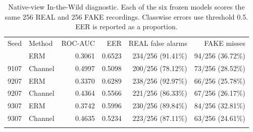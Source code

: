 \begin{table}[t]
\centering
\small
\caption{Native-view In-the-Wild diagnostic. Each of the six frozen models scores the same 256 REAL and 256 FAKE recordings. Classwise errors use threshold 0.5. EER is reported as a proportion.}\label{tab:r08-external}
\begin{tabular}{@{}llrrrr@{}}
\toprule
Seed & Method & ROC-AUC & EER & REAL false alarms & FAKE misses \\
\colrule
9107 & ERM & 0.3061 & 0.6523 & 234/256 (91.41\%) & 94/256 (36.72\%) \\
9107 & Channel & 0.4997 & 0.5098 & 200/256 (78.12\%) & 73/256 (28.52\%) \\
9207 & ERM & 0.3370 & 0.6289 & 238/256 (92.97\%) & 66/256 (25.78\%) \\
9207 & Channel & 0.4364 & 0.5566 & 221/256 (86.33\%) & 67/256 (26.17\%) \\
9307 & ERM & 0.3742 & 0.5996 & 230/256 (89.84\%) & 84/256 (32.81\%) \\
9307 & Channel & 0.4635 & 0.5234 & 223/256 (87.11\%) & 63/256 (24.61\%) \\
\botrule
\end{tabular}
\end{table}
